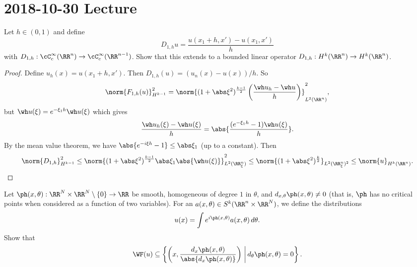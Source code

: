 \section{2018-10-30 Lecture}

\begin{exer}
  Let $h\in(0,1)$ and define
  \[ D_{1,h}u = \frac{u(x_1+h,x')-u(x_1,x')}{h} \]
  with $D_{1,h}: \cC_c^\infty(\RR^n) \to \cC_c^\infty(\RR^{n-1})$.
  Show that this extends to a bounded linear operator $D_{1,h}: H^k(\RR^n) \to H^k(\RR^n)$.
\end{exer}

\begin{proof}
  Define $u_h(x) = u(x_1+h,x')$.
  Then $D_{1,h}(u) = (u_n(x)-u(x))/h$.
  So
  \[ \norm{F_{1,h}(u)}_{H^{k-1}}^2 = \norm{(1+\abs\xi^2)^{\frac{k-1}{2}}\left( \frac{\wh u_h-\wh u}{h} \right)}_{L^2(\RR^n)}^2, \]
  but $\wh u(\xi) = e^{-\xi_1h}\wh u(\xi)$ which gives
  \[ \frac{\wh u_h(\xi)-\wh u(\xi)}{h} = \abs{\frac{(e^{-\xi_1h}-1)\wh u(\xi)}{h}}. \]
  By the mean value theorem, we have $\abs{e^{-i\xi h}-1}\leq\abs\xi_1$ (up to a constant).
  Then
  \[ \norm{D_{1,h}}_{H^{k-1}}^2 \leq \norm{(1+\abs\xi^2)^\frac{k-1}{2}\abs\xi_1\abs{\wh u(\xi)}}_{L^2(\RR_\xi^n)}^2 \leq \norm{(1+\abs\xi^2)^\frac{k}2}_{L^2(\RR_\xi^n)^2} \leq \norm{u}_{H^k(\RR^n)}. \qedhere \]
\end{proof}

\begin{exer}
  Let $\ph(x,\theta): \RR^N \times \RR^N \setminus \{0\} \to \RR$ be smooth, homogeneous of degree $1$ in $\theta$, and $d_{x,\theta}\ph(x,\theta)\neq0$ (that is, $\ph$ has no critical points when considered as a function of two variables).
  For an $a(x,\theta)\in S^k(\RR^n\times\RR^N)$, we define the distributions
  \[ u(x) = \int e^{i\ph(x,\theta)} a(x,\theta) \, d\theta. \]
  Show that
  \[ \WF(u) \subseteq \left\{ \left( x,\frac{d_x\ph(x,\theta)}{\abs{d_x\ph(x,\theta)}} \right) \, \bigg\vert \, d_\theta\ph(x,\theta)=0 \right\}. \]
\end{exer}

